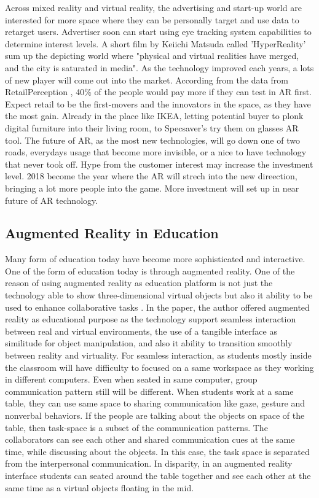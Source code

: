 \documentclass[12pt]{article}
\begin{document}
Across mixed reality and virtual reality, the advertising and start-up world are interested  for more space where they can be personally target and use data to retarget users. Advertiser soon can start using eye tracking system capabilities to determine interest levels. A short film by Keiichi Matsuda called 'HyperReality' sum up the depicting world where "physical and virtual realities have merged, and the city is saturated in media". As the technology improved each years, a lots of new player will come out into the market. According from the data from RetailPerception \cite{impat77}, 40\% of the people would pay more if they can test in AR first. Expect retail to be the first-movers and the innovators in the space, as they have the most gain. Already in the place like IKEA, letting potential buyer to plonk digital furniture into their living room, to Specsaver's try them on glasses AR tool. The future of AR, as the most new technologies, will go down one of two roads, everydays usage that become more invisible, or a nice to have technology that never took off. Hype from the customer interest may increase the investment level. 2018 become the year where the AR will strech into the new direection, bringing a lot more people into the game. More investment will set up in near future of AR technology.

\subsection{Augmented Reality in Education}
Many form of education today have become more sophisticated and interactive. One of the form of education today is through augmented reality. One of the reason of using augmented reality as education platform is not just the technology able to show three-dimensional virtual objects but also it ability to be used to enhance collaborative tasks \cite{billinghurst2002augmented}. In the paper, the author offered augmented reality as educational purpose as the technology support seamless interaction between real and virtual environments, the use of a tangible interface as similitude for object manipulation, and also it ability to transition smoothly between reality and virtuality. For seamless interaction, as students mostly inside the classroom will have difficulty to focused on a same workspace as they working in different computers. Even when seated in same computer, group communication pattern still will be different. When students work at a same table, they can use same space to sharing communication like gaze, gesture and nonverbal behaviors. If the people are talking about the objects on space of the table, then task-space is a subset of the communication patterns. The collaborators can see each other and shared communication cues at the same time, while discussing about the objects. In this case, the task space is separated from the interpersonal communication. In disparity, in an augmented reality interface students can seated around the table together and see each other at the same time as a virtual objects floating in the mid.
\end{document}
